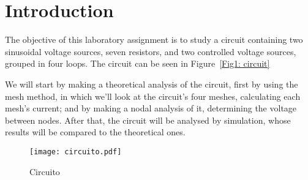 \section{Introduction}
\label{sec: introduction}

The objective of this laboratory assignment is to study a circuit containing two sinusoidal voltage sources, seven resistors, and two controlled voltage sources, grouped in four loops. The circuit can be seen in Figure~\ref{Fig1: circuit}

We will start by making a theoretical analysis of the circuit, first by  using the mesh method, in which we’ll look at the circuit’s four meshes, calculating each mesh’s current; and by making a nodal analysis of it, determining the voltage between nodes.
After that, the circuit will be analysed by simulation, whose results will be compared to the theoretical ones.

\begin{figure}[h] \centering
\texttt{[image: circuito.pdf]}
\caption{Circuito}
\label{Fig1: circuito}
\end{figure}
